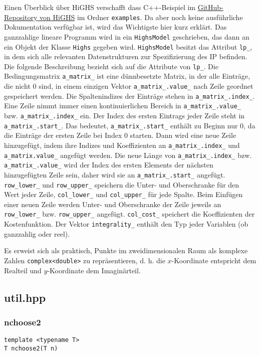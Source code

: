 \documentclass[a4paper, 10pt, ngerman]{article}
\begin{document}
Einen Überblick über HiGHS verschafft dass C++-Beispiel im \href{https://github.com/ERGO-Code/HiGHS}{GitHub-Repository von HiGHS} im Ordner \verb|examples|. Da aber noch keine ausführliche Dokumentation verfügbar ist, wird das Wichtigste hier kurz erklärt. Das ganzzahlige lineare Programm wird in ein \verb|HighsModel| geschrieben, das dann an ein Objekt der Klasse \verb|Highs| gegeben wird. \verb|HighsModel| besitzt das Attribut \verb|lp_|, in dem sich alle relevanten Datenstrukturen zur Spezifizierung des IP befinden. Die folgende Beschreibung bezieht sich auf die Attribute von \verb|lp_|. Die Bedingungsmatrix \verb|a_matrix_| ist eine dünnbesetzte Matrix, in der alle Einträge, die nicht 0 sind, in einem einzigen Vektor \verb|a_matrix_.value_| nach Zeile geordnet gespeichert werden. Die Spaltenindizes der Einträge stehen in \verb|a_matrix_.index_|. Eine Zeile nimmt immer einen kontinuierlichen Bereich in \verb|a_matrix_.value_| bzw. \verb|a_matrix_.index_| ein. Der Index des ersten Eintrags jeder Zeile steht in \verb|a_matrix_.start_|. Das bedeutet, \verb|a_matrix_.start_| enthält zu Beginn nur 0, da die Einträge der ersten Zeile bei Index 0 starten. Dann wird eine neue Zeile hinzugefügt, indem ihre Indizes und Koeffizienten an \verb|a_matrix_.index_| und \verb|a_matrix.value_| angefügt werden. Die neue Länge von \verb|a_matrix_.index_| bzw. \verb|a_matrix_.value_| wird der Index des ersten Elements der nächsten hinzugefügten Zeile sein, daher wird sie an \verb|a_matrix_.start_| angefügt. \verb|row_lower_| und \verb|row_upper_| speichern die Unter- und Oberschranke für den Wert jeder Zeile, \verb|col_lower_| und \verb|col_upper_| für jede Spalte. Beim Einfügen einer neuen Zeile werden Unter- und Oberschranke der Zeile jeweils an \verb|row_lower_| bzw. \verb|row_upper_| angefügt. \verb|col_cost_| speichert die Koeffizienten der Kostenfunktion. Der Vektor \verb|integrality_| enthält den Typ jeder Variablen (ob ganzzahlig oder reel).

Es erweist sich als praktisch, Punkte im zweidimensionalen Raum als komplexe Zahlen \verb|complex<double>| zu repräsentieren, d. h. die $x$-Koordinate entspricht dem Realteil und $y$-Koordinate dem Imaginärteil. 

\subsection{util.hpp}

\subsubsection{nchoose2}
\verb|template <typename T>| \\
\verb|T nchoose2(T n)|
\medskip
\end{document}
